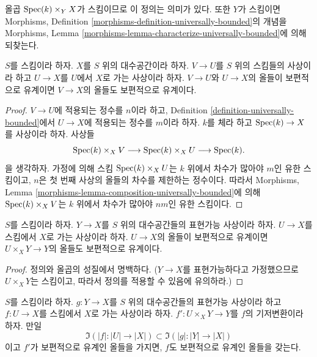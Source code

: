 \noindent
올곱 $\mathop{\mathrm{Spec}}(k) \times_Y X$가 스킴이므로 이 정의는 의미가 있다.
또한 $Y$가 스킴이면 Morphisms, Definition
\ref{morphisms-definition-universally-bounded}의 개념을 Morphisms, Lemma
\ref{morphisms-lemma-characterize-universally-bounded}에 의해 되찾는다.

\begin{lemma}
\label{lemma-composition-universally-bounded}
$S$를 스킴이라 하자. $X$를 $S$ 위의 대수공간이라 하자.
$V \to U$를 $S$ 위의 스킴들의 사상이라 하고 $U \to X$를 $U$에서
$X$로 가는 사상이라 하자. $V \to U$와 $U \to X$의 올들이
보편적으로 유계이면 $V \to X$의 올들도 보편적으로 유계이다.
\end{lemma}

\begin{proof}
$V \to U$에 적용되는 정수를 $n$이라 하고, Definition
\ref{definition-universally-bounded}에서 $U \to X$에 적용되는 정수를
$m$이라 하자. $k$를 체라 하고 $\mathop{\mathrm{Spec}}(k) \to X$를 사상이라 하자.
사상들
$$
\mathop{\mathrm{Spec}}(k) \times_X V
\longrightarrow
\mathop{\mathrm{Spec}}(k) \times_X U
\longrightarrow
\mathop{\mathrm{Spec}}(k).
$$
을 생각하자. 가정에 의해 스킴 $\mathop{\mathrm{Spec}}(k) \times_X U$는 $k$ 위에서
차수가 많아야 $m$인 유한 스킴이고, $n$은 첫 번째 사상의 올들의 차수를
제한하는 정수이다. 따라서 Morphisms, Lemma
\ref{morphisms-lemma-composition-universally-bounded}에 의해
$\mathop{\mathrm{Spec}}(k) \times_X V$는 $k$ 위에서 차수가 많아야 $nm$인 유한 스킴이다.
\end{proof}

\begin{lemma}
\label{lemma-base-change-universally-bounded}
$S$를 스킴이라 하자. $Y \to X$를 $S$ 위의 대수공간들의 표현가능 사상이라
하자. $U \to X$를 스킴에서 $X$로 가는 사상이라 하자. $U \to X$의
올들이 보편적으로 유계이면 $U \times_X Y \to Y$의 올들도 보편적으로
유계이다.
\end{lemma}

\begin{proof}
정의와 올곱의 성질에서 명백하다. ($Y \to X$를 표현가능하다고 가정했으므로
$U \times_X Y$는 스킴이고, 따라서 정의를 적용할 수 있음에 유의하라.)
\end{proof}

\begin{lemma}
\label{lemma-descent-universally-bounded}
$S$를 스킴이라 하자. $g : Y \to X$를 $S$ 위의 대수공간들의 표현가능
사상이라 하고 $f : U \to X$를 스킴에서 $X$로 가는 사상이라 하자.
$f' : U \times_X Y \to Y$를 $f$의 기저변환이라 하자. 만일
$$
\Im(|f| : |U| \to |X|) \subset \Im(|g| : |Y| \to |X|)
$$
이고 $f'$가 보편적으로 유계인 올들을 가지면, $f$도 보편적으로 유계인
올들을 갖는다.
\end{lemma}

